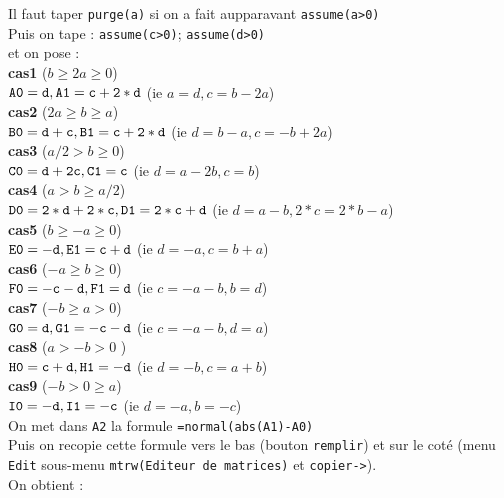 \documentclass[a4paper,11pt]{book}
\begin{document}
Il faut taper {\tt purge(a)} si on a fait aupparavant {\tt assume(a>0)}\\
Puis on tape : {\tt assume(c>0)}; {\tt assume(d>0)}\\
et on pose :\\
{\bf cas1} ($b \geq 2a \geq 0$)\\
${\tt A0=d, A1=c+2*d}$ (ie $a=d, c=b-2a$)\\
{\bf cas2} ($2a \geq b \geq a$)\\
${\tt B0=d+c, B1=c+2*d}$ (ie $d=b-a,c=-b+2a$)\\
{\bf cas3} ($a/2 >b \geq 0$)\\
${\tt C0=d+2c, C1=c}$ (ie $d=a-2b,c=b$)\\
{\bf cas4} ($a>  b \geq a/2$)\\
${\tt D0=2*d+2*c, D1=2*c+d}$ (ie $d=a-b,2*c=2*b-a$)\\
{\bf cas5} ($b \geq -a \geq 0$)\\
${\tt E0=-d, E1=c+d}$ (ie $d=-a,c=b+a$)\\
{\bf cas6} ($-a \geq b \geq 0$)\\
${\tt F0=-c-d, F1=d}$ (ie $c=-a-b, b=d$)\\
{\bf cas7} ($-b \geq a >0$)\\
${\tt G0=d, G1=-c-d}$ (ie $c=-a-b,d=a$)\\
{\bf cas8} ($a >-b >0$ )\\
${\tt H0=c+d, H1=-d}$ (ie $d=-b,c=a+b$)\\
{\bf cas9} ($-b >0 \geq a $)\\
${\tt I0=-d, I1=-c}$ (ie $d=-a,b=-c$)\\
On met dans {\tt A2} la formule  {\tt =normal(abs(A1)-A0)}\\
Puis on recopie cette formule vers le bas (bouton {\tt remplir}) et sur le 
cot\'e (menu {\tt Edit} sous-menu {\tt mtrw(Editeur de matrices)} et 
{\tt copier->}).\\
On obtient :\\
\ \\
\end{document}
